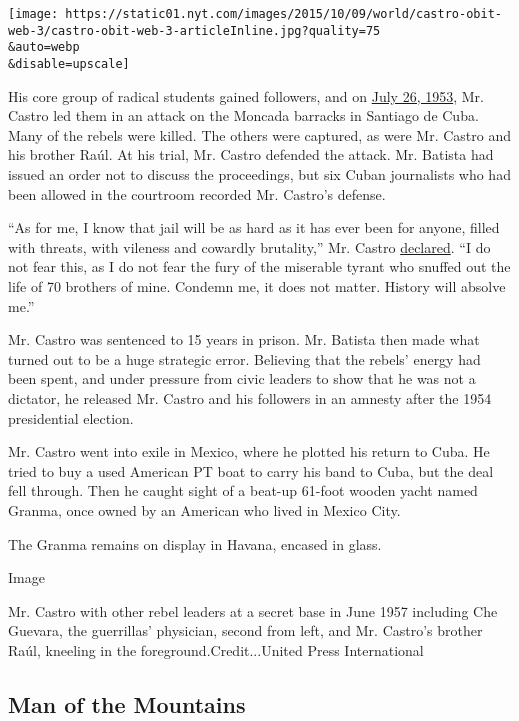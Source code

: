 \texttt{[image: https://static01.nyt.com/images/2015/10/09/world/castro-obit-web-3/castro-obit-web-3-articleInline.jpg?quality=75\\\&auto=webp\\\&disable=upscale]}

His core group of radical students gained followers, and on
\href{http://query.nytimes.com/mem/archive-free/pdf?res=9806E6D81F3DE03ABC4F51DFB1668388649EDE}{July
26, 1953}, Mr. Castro led them in an attack on the Moncada barracks in
Santiago de Cuba. Many of the rebels were killed. The others were
captured, as were Mr. Castro and his brother Raúl. At his trial, Mr.
Castro defended the attack. Mr. Batista had issued an order not to
discuss the proceedings, but six Cuban journalists who had been allowed
in the courtroom recorded Mr. Castro's defense.

``As for me, I know that jail will be as hard as it has ever been for
anyone, filled with threats, with vileness and cowardly brutality,'' Mr.
Castro
\href{https://www.marxists.org/history/cuba/archive/castro/1953/10/16.htm}{declared}.
``I do not fear this, as I do not fear the fury of the miserable tyrant
who snuffed out the life of 70 brothers of mine. Condemn me, it does not
matter. History will absolve me.''

Mr. Castro was sentenced to 15 years in prison. Mr. Batista then made
what turned out to be a huge strategic error. Believing that the rebels'
energy had been spent, and under pressure from civic leaders to show
that he was not a dictator, he released Mr. Castro and his followers in
an amnesty after the 1954 presidential election.

Mr. Castro went into exile in Mexico, where he plotted his return to
Cuba. He tried to buy a used American PT boat to carry his band to Cuba,
but the deal fell through. Then he caught sight of a beat-up 61-foot
wooden yacht named Granma, once owned by an American who lived in Mexico
City.

The Granma remains on display in Havana, encased in glass.

Image

Mr. Castro with other rebel leaders at a secret base in June 1957
including Che Guevara, the guerrillas' physician, second from left, and
Mr. Castro's brother Raúl, kneeling in the foreground.Credit...United
Press International

\hypertarget{man-of-the-mountains}{%
\subsection{Man of the Mountains}\label{man-of-the-mountains}}

